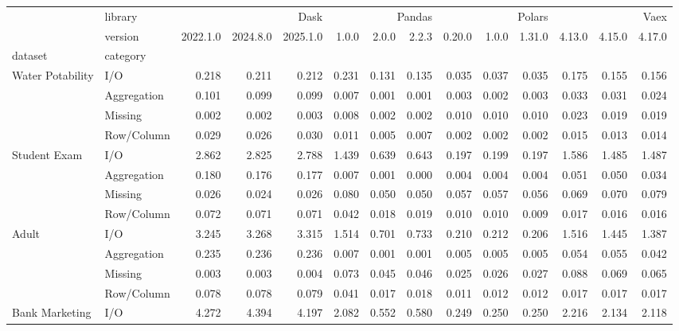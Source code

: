 \begin{tabular}{llrrrrrrrrrrrr}
\toprule
 & library & \multicolumn{3}{r}{Dask} & \multicolumn{3}{r}{Pandas} & \multicolumn{3}{r}{Polars} & \multicolumn{3}{r}{Vaex} \\
 & version & 2022.1.0 & 2024.8.0 & 2025.1.0 & 1.0.0 & 2.0.0 & 2.2.3 & 0.20.0 & 1.0.0 & 1.31.0 & 4.13.0 & 4.15.0 & 4.17.0 \\
dataset & category &  &  &  &  &  &  &  &  &  &  &  &  \\
\midrule
\multirow[t]{4}{*}{Water Potability} & I/O & 0.218 & 0.211 & 0.212 & 0.231 & 0.131 & 0.135 & 0.035 & 0.037 & 0.035 & 0.175 & 0.155 & 0.156 \\
 & Aggregation & 0.101 & 0.099 & 0.099 & 0.007 & 0.001 & 0.001 & 0.003 & 0.002 & 0.003 & 0.033 & 0.031 & 0.024 \\
 & Missing & 0.002 & 0.002 & 0.003 & 0.008 & 0.002 & 0.002 & 0.010 & 0.010 & 0.010 & 0.023 & 0.019 & 0.019 \\
 & Row/Column & 0.029 & 0.026 & 0.030 & 0.011 & 0.005 & 0.007 & 0.002 & 0.002 & 0.002 & 0.015 & 0.013 & 0.014 \\
\cline{1-14}
\multirow[t]{4}{*}{Student Exam} & I/O & 2.862 & 2.825 & 2.788 & 1.439 & 0.639 & 0.643 & 0.197 & 0.199 & 0.197 & 1.586 & 1.485 & 1.487 \\
 & Aggregation & 0.180 & 0.176 & 0.177 & 0.007 & 0.001 & 0.000 & 0.004 & 0.004 & 0.004 & 0.051 & 0.050 & 0.034 \\
 & Missing & 0.026 & 0.024 & 0.026 & 0.080 & 0.050 & 0.050 & 0.057 & 0.057 & 0.056 & 0.069 & 0.070 & 0.079 \\
 & Row/Column & 0.072 & 0.071 & 0.071 & 0.042 & 0.018 & 0.019 & 0.010 & 0.010 & 0.009 & 0.017 & 0.016 & 0.016 \\
\cline{1-14}
\multirow[t]{4}{*}{Adult} & I/O & 3.245 & 3.268 & 3.315 & 1.514 & 0.701 & 0.733 & 0.210 & 0.212 & 0.206 & 1.516 & 1.445 & 1.387 \\
 & Aggregation & 0.235 & 0.236 & 0.236 & 0.007 & 0.001 & 0.001 & 0.005 & 0.005 & 0.005 & 0.054 & 0.055 & 0.042 \\
 & Missing & 0.003 & 0.003 & 0.004 & 0.073 & 0.045 & 0.046 & 0.025 & 0.026 & 0.027 & 0.088 & 0.069 & 0.065 \\
 & Row/Column & 0.078 & 0.078 & 0.079 & 0.041 & 0.017 & 0.018 & 0.011 & 0.012 & 0.012 & 0.017 & 0.017 & 0.017 \\
\cline{1-14}
\multirow[t]{4}{*}{Bank Marketing} & I/O & 4.272 & 4.394 & 4.197 & 2.082 & 0.552 & 0.580 & 0.249 & 0.250 & 0.250 & 2.216 & 2.134 & 2.118 \\

\end{tabular}
